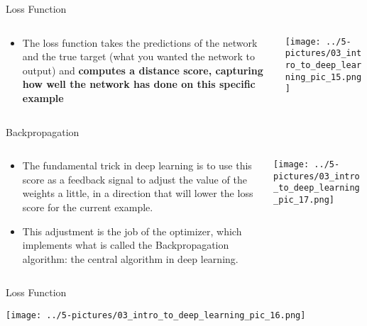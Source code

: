 \documentclass[11pt]{beamer}
\begin{document}
\begin{frame}{Loss Function}
\begin{columns}[T] %
\begin{column}{.48\textwidth}
        \begin{itemize}
		\item The loss function takes the predictions of the network and the true target (what you wanted the network to output) and \textbf{computes a distance score, capturing how well the network has done on this specific example}
        \end{itemize}
\end{column}%
\hfill%
\begin{column}{.48\textwidth}
        \texttt{[image: ../5-pictures/03\_intro\_to\_deep\_learning\_pic\_15.png]}
\end{column}%
\end{columns}
\end{frame}
\begin{frame}{Backpropagation}
\begin{columns}[T] %
\begin{column}{.48\textwidth}
        \begin{itemize}
		\item The fundamental trick in deep learning is to use this score as a feedback signal to adjust the value of the weights a little, in a direction that will lower the loss score for the current example. 
		\item This adjustment is the job of the optimizer, which implements what is called the Backpropagation algorithm: the central algorithm in deep learning.
        \end{itemize}
\end{column}%
\hfill%
\begin{column}{.48\textwidth}
        \texttt{[image: ../5-pictures/03\_intro\_to\_deep\_learning\_pic\_17.png]}
\end{column}%
\end{columns}
\end{frame}
\begin{frame}{Loss Function}
	\begin{center}
	\texttt{[image: ../5-pictures/03\_intro\_to\_deep\_learning\_pic\_16.png]}
	\end{center}
\end{frame}
\end{document}
